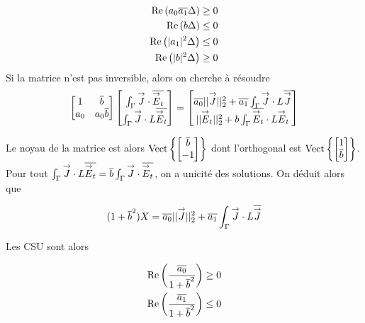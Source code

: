     \begin{align}
    \Re\left(a_0\conj{a_1}\Delta\right) &\ge 0\\
    \Re\left(b\Delta\right) &\le 0\\
    \Re\left(|a_1|^2\Delta\right) &\le 0\\
    \Re\left(|b|^2\Delta\right) &\ge 0
  \end{align}
  Si la matrice n'est pas inversible, alors on cherche à résoudre
  \[
    \begin{bmatrix}
      1 & \conj{b} \\
      a_0 & a_0\conj{b}
    \end{bmatrix}
    \begin{bmatrix}
      \int_\Gamma \vJ \cdot \conj{\vE_t} \\
      \int_\Gamma \vJ \cdot L\conj{\vE_t}
    \end{bmatrix}
    =
    \begin{bmatrix}
      \conj{a_0}||\vJ||_2^2 + \conj{a_1}\int_\Gamma \vJ \cdot L\conj{\vJ} \\
      ||\vE_t||_2^2 + b\int_\Gamma \conj{\vE_t} \cdot L\vE_t
    \end{bmatrix}
  \]

  Le noyau de la matrice est alors \(\Vect{\begin{bmatrix}\conj{b}\\-1\end{bmatrix}}\) dont l'orthogonal est  \(\Vect{\begin{bmatrix}1\\\conj{b}\end{bmatrix}}\).
  Pour tout \(\int_\Gamma \vJ\cdot L\conj{\vE_t} = \conj{b} \int_\Gamma \vJ \cdot \conj{\vE_t} \), on a unicité des solutions. On déduit alors que

  \[
    (1 + \conj{b}^2) X = \conj{a_0} ||\vJ||_2^2 + \conj{a_1}\int_\Gamma \vJ \cdot L\conj{\vJ}
  \]

  Les CSU sont alors

  \begin{align}
    \Re\left(\frac{\conj{a_0}}{1 + \conj{b}^2}\right) &\ge 0 \\
    \Re\left(\frac{\conj{a_1}}{1 + \conj{b}^2}\right) &\le 0
  \end{align}



